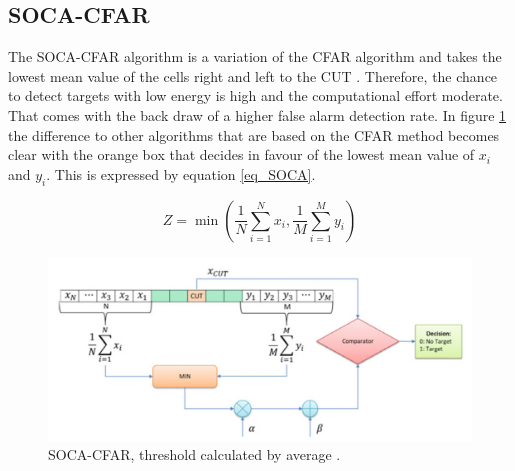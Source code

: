     \subsection{\ac{SOCA-CFAR}} \label{SOCAthre}
   The \ac{SOCA-CFAR} algorithm is a variation of the \ac{CFAR} algorithm and takes the lowest mean value of the cells right and left to the \ac{CUT} \cite{SigProcRADAR}. Therefore, the chance to detect targets with low energy is high and the computational effort moderate. That comes with the back draw of a higher false alarm detection rate. In figure \ref{fig_SOCACFAR} the difference to other algorithms that are based on the \ac{CFAR} method becomes clear with the orange box that decides in favour of the lowest mean value of $x_i$ and $y_i$. This is expressed by equation \ref{eq_SOCA}.%
   
   
   
   \begin{equation}
   Z= \min (\frac{1}{N}\sum_{i=1}^{N}x_i,\frac{1}{M}\sum_{i=1}^{M}y_i)
   \label{eq_SOCA}
   \end{equation}
   
   \begin{figure}
   	\begin{centering}
   		\includegraphics[width=0.6\linewidth,keepaspectratio]{Bilder/SOCACFAR.png}
   		\caption{\ac{SOCA-CFAR}, threshold calculated by average \cite{SigProcRADAR}.}
   		\label{fig_SOCACFAR}%
   	\end{centering}
   \end{figure}
